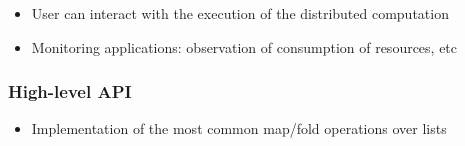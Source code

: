 \documentclass[xcolor=dvipsnames,8pt]{beamer}
\begin{document}
\begin{frame}
\medskip\noindent
  \begin{itemize}
  \item User can interact with the execution of the distributed
    computation
  \item Monitoring applications: observation of consumption of
  resources, etc
  \end{itemize}
\end{frame}


\begin{frame}\frametitle {High-level API}
  \begin{itemize}
  \item Implementation of the most common map/fold operations over lists
  \end{itemize}
  

\medskip\noindent
{\colorbox{tmpcolor}{\begin{minipage}{\textwidth}\tt\parindent 0pt


\end{minipage}}}
\end{frame}
\end{document}
